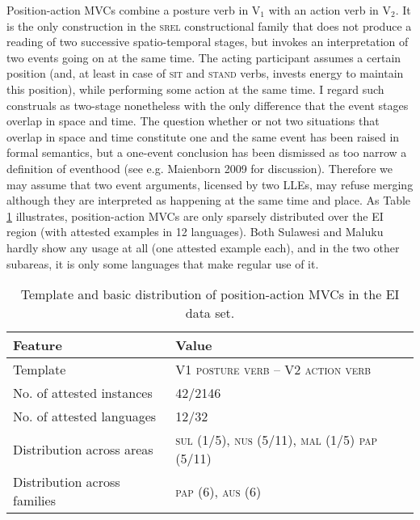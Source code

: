 Position-action MVCs combine a posture verb in V$_1$ with an action verb in V$_2$. It is the only construction in the \textsc{srel} constructional family that does not produce a reading of two successive spatio-temporal stages, but invokes an interpretation of two events going on at the same time. The acting participant assumes a certain position (and, at least in case of \textsc{sit} and \textsc{stand} verbs, invests energy to maintain this position), while performing some action at the same time. I regard such construals as two-stage nonetheless with the only difference that the event stages overlap in space and time. The question whether or not two situations that overlap in space and time constitute one and the same event has been raised in formal semantics, but a one-event conclusion has been dismissed as too narrow a definition of eventhood (see e.g. Maienborn 2009 for discussion). Therefore we may assume that two event arguments, licensed by two LLEs, may refuse merging although they are interpreted as happening at the same time and place. As Table \ref{table:position-action} illustrates, position-action MVCs are only sparsely distributed over the EI region (with attested examples in 12 languages). Both Sulawesi and Maluku hardly show any usage at all (one attested example each), and in the two other subareas, it is only some languages that make regular use of it.

\begin{table}


\begin{tabular}{ll}
\lsptoprule
Feature&Value\tabularnewline
\hline
Template&V1 \textsc{posture verb} -- V2 \textsc{action verb}\tabularnewline
No. of attested instances& 42/2146 \tabularnewline
No. of attested languages& 12/32 \tabularnewline
Distribution across areas& \textsc{sul} (1/5), \textsc{nus} (5/11), \textsc{mal} (1/5) \textsc{pap} (5/11) \tabularnewline
Distribution across families& \textsc{pap} (6), \textsc{aus} (6) \tabularnewline
\hline
\end{tabular}
\caption[Template and basic distribution of position-action MVCs]{Template and basic distribution of position-action MVCs in the EI data set.}
\label{table:position-action}
\end{table}


